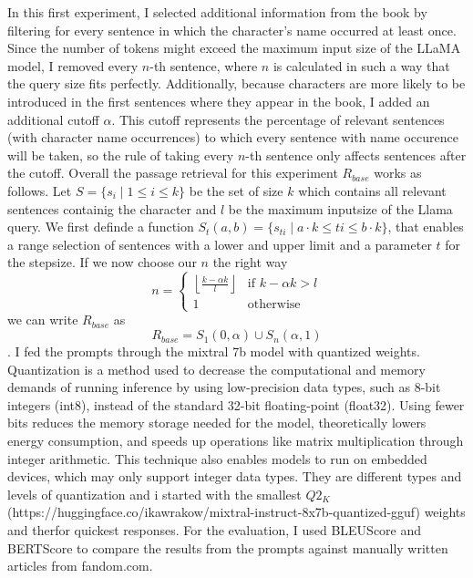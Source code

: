 In this first experiment, I selected additional information from the book by filtering for every sentence in which the character's name occurred at least once. Since the number of tokens might exceed the maximum input size of the LLaMA model, I removed every $n$-th sentence, where $n$ is calculated in such a way that the query size fits perfectly.
Additionally, because characters are more likely to be introduced in the first sentences where they appear in the book, I added an additional cutoff $\alpha$. This cutoff represents the percentage of relevant sentences (with character name occurrences) to which every sentence with name occurence will be taken, so the rule of taking every $n$-th sentence only affects sentences after the cutoff. Overall the passage retrieval for this experiment $R_{base}$ works as follows. Let $S = \{s_i \mid 1 \leq i \leq k \}$ be the set of size $k$ which contains all relevant sentences containig the character and $l$ be the maximum inputsize of the Llama query. We first definde a function $S_{t}(a, b) = \{ s_{ti} \mid a \cdot k \leq ti \leq b \cdot k \}$, that enables a range selection of sentences with a lower and upper limit and a parameter $t$ for the stepsize. If we now choose our $n$ the right way 
\[n = \begin{cases} 
    \left\lfloor \frac{k - \alpha k}{l}\right\rfloor & \text{if } k - \alpha k > l\\
    1 & \text{otherwise}
\end{cases} \] we can write $R_{base}$ as \[R_{base} = S_{1}(0, \alpha) \cup S_{n} ( \alpha, 1) \].
I fed the prompts through the mixtral 7b model with quantized weights.
Quantization is a method used to decrease the computational and memory demands of running inference by using low-precision data types, such as 8-bit integers (int8), instead of the standard 32-bit floating-point (float32). Using fewer bits reduces the memory storage needed for the model, theoretically lowers energy consumption, and speeds up operations like matrix multiplication through integer arithmetic. This technique also enables models to run on embedded devices, which may only support integer data types. They are different types and levels of quantization and i started with the smallest $Q2_K$ (https://huggingface.co/ikawrakow/mixtral-instruct-8x7b-quantized-gguf) weights and therfor quickest responses. For the evaluation, I used BLEUScore and BERTScore to compare the results from the prompts against manually written articles from fandom.com.\\

